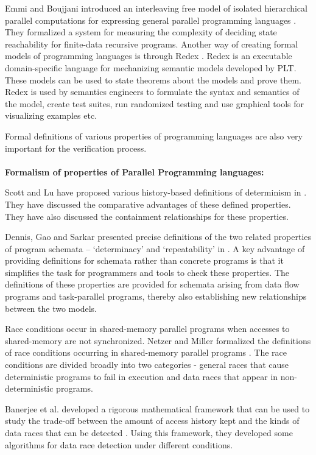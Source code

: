 Emmi and Boujjani introduced an interleaving free model of isolated hierarchical parallel computations for expressing general parallel programming languages \cite{bouajjani2012analysis}. They formalized a system for measuring the complexity of deciding state reachability for finite-data recursive programs. Another way of creating formal models of programming languages is through Redex \cite{klein2012run}. Redex is an executable domain-specific language for mechanizing semantic models developed by PLT. These models can be used to state theorems about the models and prove them. Redex is used by semantics engineers to formulate the syntax and semantics of the model, create test suites, run randomized testing and use graphical tools for visualizing examples etc.

Formal definitions of various properties of programming languages are also very important for the verification process.
\\
\\
\textbf{Formalism of properties of Parallel Programming languages:}

Scott and Lu have proposed various history-based definitions of determinism in \cite{lu2011toward}. They have discussed the comparative advantages of these defined properties. They have also discussed the containment relationships for these properties.

Dennis, Gao and Sarkar presented precise definitions of the two related properties of program schemata – ‘determinacy’ and ‘repeatability’ in \cite{dennis2012determinacy}. A key advantage of providing definitions for schemata rather than concrete programs is that it simplifies the task for programmers and tools to check these properties. The definitions of these properties are provided for schemata arising from data flow programs and task-parallel programs, thereby also establishing new relationships between the two models.

Race conditions occur in shared-memory parallel programs when accesses to shared-memory are not synchronized. Netzer and Miller formalized the definitions of  race conditions occurring in shared-memory parallel programs \cite{netzer1992race}. The race conditions are divided broadly into two categories - general races that cause deterministic programs to fail in execution and data races that appear in non-deterministic programs.

Banerjee et al. developed a rigorous mathematical framework that can be used to study the trade-off between the amount of access history kept and the kinds of data races that can be detected \cite{banerjee2006theory}. Using this framework, they developed some algorithms for data race detection under different conditions.

